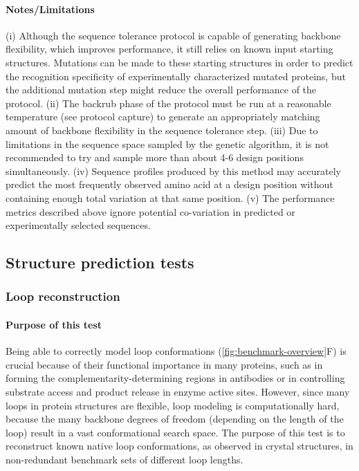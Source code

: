 \paragraph{Notes/Limitations}
(i) Although the sequence tolerance protocol is capable of generating backbone flexibility, which improves performance, it still relies on known input starting structures. Mutations can be made to these starting structures in order to predict the recognition specificity of experimentally characterized mutated proteins, but the additional mutation step might reduce the overall performance of the protocol. (ii) The backrub phase of the protocol must be run at a reasonable temperature (see protocol capture) to generate an appropriately matching amount of backbone flexibility in the sequence tolerance step. (iii) Due to limitations in the sequence space sampled by the genetic algorithm, it is not recommended to try and sample more than about 4-6 design positions simultaneously. (iv) Sequence profiles produced by this method may accurately predict the most frequently observed amino acid at a design position without containing enough total variation at that same position. (v) The performance metrics described above ignore potential co-variation in predicted or experimentally selected sequences.

\subsection{Structure prediction tests}

\subsubsection{Loop reconstruction}

\paragraph{Purpose of this test}
Being able to correctly model loop conformations (\cref{fig:benchmark-overview}F) is crucial because of their functional importance in many proteins, such as in forming the complementarity-determining regions in antibodies or in controlling substrate access and product release in enzyme active sites. However, since many loops in protein structures are flexible, loop modeling is computationally hard, because the many backbone degrees of freedom (depending on the length of the loop) result in a vast conformational search space. The purpose of this test is to reconstruct known native loop conformations, as observed in crystal structures, in non-redundant benchmark sets of different loop lengths.

